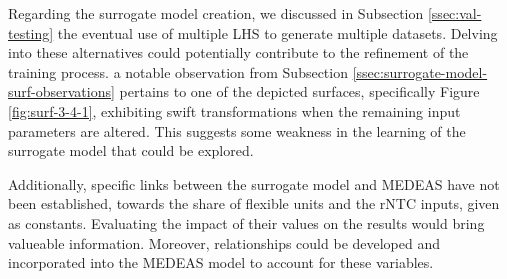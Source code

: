 Regarding the surrogate model creation, we discussed in Subsection \ref{ssec:val-testing} the eventual use of multiple LHS to generate multiple datasets. Delving into these alternatives could potentially contribute to the refinement of the training process. a notable observation from Subsection \ref{ssec:surrogate-model-surf-observations} pertains to one of the depicted surfaces, specifically Figure \ref{fig:surf-3-4-1}, exhibiting swift transformations when the remaining input parameters are altered. This suggests some weakness in the learning of the surrogate model that could be explored.

Additionally, specific links between the surrogate model and MEDEAS have not been established, towards the share of flexible units and the rNTC inputs, given as constants. Evaluating the impact of their values on the results would bring valueable information. Moreover, relationships could be developed and incorporated into the MEDEAS model to account for these variables.